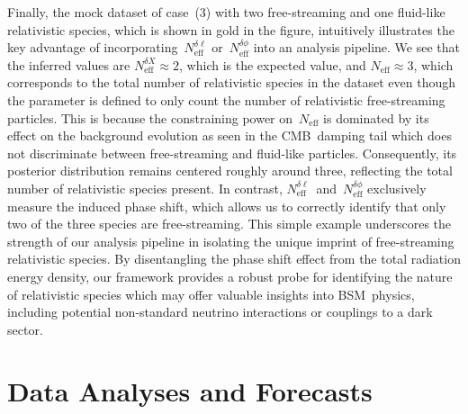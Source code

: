 \documentclass[11pt]{article}
\numberwithin{equation}{section}
\newcommand{\Neff}{N_\mathrm{eff}}
\newcommand{\Nphase}{N_\mathrm{eff}^{\delta\phi}}
\newcommand{\Nmultipole}{N_\mathrm{eff}^{\delta\ell}}
\begin{document}
Finally, the mock dataset of case~(3) with two free-streaming and one fluid-like relativistic species, which is shown in gold in the figure, intuitively illustrates the key advantage of incorporating~$\Nmultipole$ or~$\Nphase$ into an analysis pipeline. We see that the inferred values are $\Neff^{\delta X} \approx 2$, which is the expected value, and $\Neff \approx 3$, which corresponds to the total number of relativistic species in the dataset even though the parameter is defined to only count the number of relativistic free-streaming particles. This is because the constraining power on~$\Neff$ is dominated by its effect on the background evolution as seen in the CMB~damping tail which does not discriminate between free-streaming and fluid-like particles. Consequently, its posterior distribution remains centered roughly around three, reflecting the total number of relativistic species present. In contrast, $\Nmultipole$~and~$\Nphase$ exclusively measure the induced phase shift, which allows us to correctly identify that only two of the three species are free-streaming. This simple example underscores the strength of our analysis pipeline in isolating the unique imprint of free-streaming relativistic species. By disentangling the phase shift effect from the total radiation energy density, our framework provides a robust probe for identifying the nature of relativistic species which may offer valuable insights into BSM~physics, including potential non-standard neutrino interactions or couplings to a dark sector.



\section{Data Analyses and Forecasts}
\label{sec:analysis-forecasts}
\end{document}
